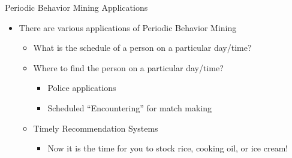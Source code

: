 \documentclass[
 size=14pt,
 paper=smartboard,  %
 mode=present, 		%
 display=slides, 	%
 style=tuliplab,  	%
 pauseslide,
 fleqn,leqno]{powerdot}
\begin{document}
\begin{slide}[toc=,bm=]{Periodic Behavior Mining Applications}

\begin{itemize}
\item
There are various applications of Periodic Behavior Mining

    \begin{itemize}
    \item
    What is the schedule of a person on a particular day/time?

    \item
    Where to find the person on a particular day/time?
        \begin{itemize}
        \item
        Police applications

        \item
        Scheduled ``Encountering'' for match making
        \end{itemize}
    \item
    Timely Recommendation Systems
        \begin{itemize}
        \item
        Now it is the time for you to stock rice, cooking oil, or ice cream!

        \end{itemize}

\end{itemize}

\end{itemize}

\end{slide}
\end{document}
